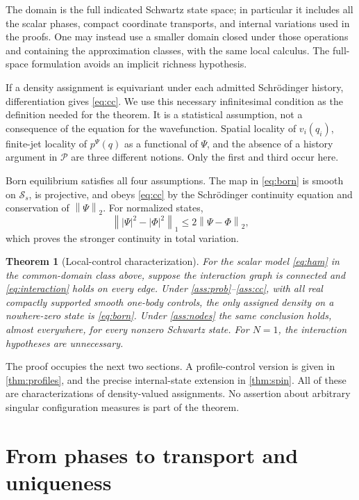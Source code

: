\documentclass[11pt]{article}
\numberwithin{equation}{section}
\newtheorem{theorem}{Theorem}[section]
\theoremstyle{definition}
\newcommand{\Pcal}{\mathcal P}
\newcommand{\norm}[1]{\left\|#1\right\|}
\begin{document}
The domain is the full indicated Schwartz state space; in particular it includes all the scalar phases, compact coordinate transports, and internal variations used in the proofs. One may instead use a smaller domain closed under those operations and containing the approximation classes, with the same local calculus. The full-space formulation avoids an implicit richness hypothesis.

If a density assignment is equivariant under each admitted Schr\"odinger history, differentiation gives \eqref{eq:cc}. We use this necessary infinitesimal condition as the definition needed for the theorem. It is a statistical assumption, not a consequence of the equation for the wavefunction. Spatial locality of \(v_i(q_i)\), finite-jet locality of \(p^\Psi(q)\) as a functional of \(\Psi\), and the absence of a history argument in \(\Pcal\) are three different notions. Only the first and third occur here.

Born equilibrium satisfies all four assumptions. The map in \eqref{eq:born} is smooth on \(\mathscr S_s\), is projective, and obeys \eqref{eq:cc} by the Schr\"odinger continuity equation and conservation of \(\norm{\Psi}_2\). For normalized states,
\begin{equation}\label{eq:L2TV}
 \norm{|\Psi|^2-|\Phi|^2}_1\le 2\norm{\Psi-\Phi}_2,
\end{equation}
which proves the stronger continuity in total variation.

\begin{theorem}[Local-control characterization]\label{thm:main}
For the scalar model \eqref{eq:ham} in the common-domain class above, suppose the interaction graph is connected and \eqref{eq:interaction} holds on every edge. Under \ref{ass:prob}--\ref{ass:cc}, with all real compactly supported smooth one-body controls, the only assigned density on a nowhere-zero state is \eqref{eq:born}. Under \ref{ass:nodes} the same conclusion holds, almost everywhere, for every nonzero Schwartz state. For \(N=1\), the interaction hypotheses are unnecessary.
\end{theorem}

The proof occupies the next two sections. A profile-control version is given in \cref{thm:profiles}, and the precise internal-state extension in \cref{thm:spin}. All of these are characterizations of density-valued assignments. No assertion about arbitrary singular configuration measures is part of the theorem.

\section{From phases to transport and uniqueness}\label{sec:mechanism}
\end{document}
